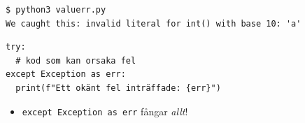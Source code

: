 \begin{frame}[fragile]
  \begin{example}
    \inputminted{python}{examples/valuerr.py}
  \end{example}

  \pause

  \begin{example}
    \begin{verbatim}
$ python3 valuerr.py
We caught this: invalid literal for int() with base 10: 'a'
    \end{verbatim}
  \end{example}
\end{frame}

\begin{frame}[fragile]
  \begin{verbatim}
try:
  # kod som kan orsaka fel
except Exception as err:
  print(f"Ett okänt fel inträffade: {err}")
  \end{verbatim}
  \begin{remark}
    \begin{itemize}
      \item \texttt{except Exception as err} fångar \emph{allt}!
    \end{itemize}
  \end{remark}
\end{frame}

\begin{frame}[fragile]
  \begin{example}[manyerr.py]
    \inputminted{python}{examples/manyerr.py}
  \end{example}
\end{frame}

\begin{frame}[fragile]
  \inputminted[linenos,firstline=37,highlightlines={38,41,42}]{python}{examples/age-funcs-input.py}
\end{frame}

